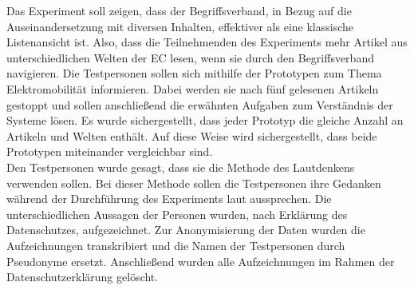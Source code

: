 Das Experiment soll zeigen, dass der Begriffsverband, in Bezug auf die Auseinandersetzung mit diversen Inhalten, effektiver als eine klassische Listenansicht ist.
Also, dass die Teilnehmenden des Experiments mehr Artikel aus unterschiedlichen Welten der \ac{EC} lesen, wenn sie durch den Begriffsverband navigieren.
Die Testpersonen sollen sich mithilfe der Prototypen zum Thema Elektromobilität informieren.
Dabei werden sie nach fünf gelesenen Artikeln gestoppt und sollen anschließend die erwähnten Aufgaben zum Verständnis der Systeme lösen.
Es wurde sichergestellt, dass jeder Prototyp die gleiche Anzahl an Artikeln und Welten enthält.
Auf diese Weise wird sichergestellt, dass beide Prototypen miteinander vergleichbar sind.\\

Den Testpersonen wurde gesagt, dass sie die Methode des Lautdenkens verwenden sollen.
Bei dieser Methode sollen die Testpersonen ihre Gedanken während der Durchführung des Experiments laut aussprechen.
Die unterschiedlichen Aussagen der Personen wurden, nach Erklärung des Datenschutzes, aufgezeichnet.
Zur Anonymisierung der Daten wurden die Aufzeichnungen transkribiert und die Namen der Testpersonen durch Pseudonyme ersetzt.
Anschließend wurden alle Aufzeichnungen im Rahmen der Datenschutzerklärung gelöscht.\\


